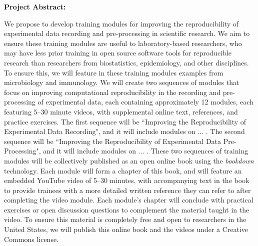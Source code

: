 \documentclass[pdftex,english,11pt,parskip=half]{scrartcl}
\begin{document}
\def\bf{\normalfont\bfseries}
\pagestyle{empty}

{\large \textbf{Project Abstract:}}


We propose to develop training modules for improving the reproducibility of experimental data recording and pre-processing in scientific research. We aim to ensure these training modules are useful to laboratory-based researchers, who may have less prior training in open source software tools for reproducible research than researchers from biostatistics, epidemiology, and other disciplines. To ensure this, we will feature in these training modules examples from microbiology and immunology. We will create two sequences of modules that focus on improving computational reproducibility in the recording and pre-processing of experimental data, each containing approximately 12 modules, each featuring 5--30 minute videos, with supplemental online text, references, and practice exercises. The first sequence will be ``Improving the Reproducibility of Experimental Data Recording", and it will include modules on ... . The second sequence will be ``Improving the Reproducibility of Experimental Data Pre-Processing", and it will include modules on ... . These two sequences of training modules will be collectively published as an open online book using the \textit{bookdown} technology. Each module will form a chapter of this book, and will feature an embedded YouTube video of 5--30 minutes, with accompanying text in the book to provide trainees with a more detailed written reference they can refer to after completing the video module. Each module's chapter will conclude with practical exercises or open discussion questions to complement the material taught in the video. To ensure this material is completely free and open to researchers in the United States, we will publish this online book and the videos under a Creative Commons license.
\end{document}
